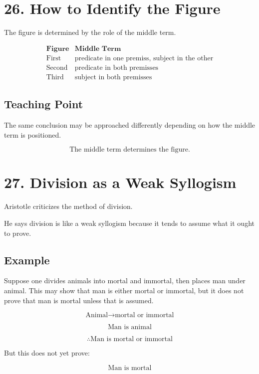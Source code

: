 \documentclass[12pt]{article}
\begin{document}
\section*{26. How to Identify the Figure}

The figure is determined by the role of the middle term.

\[
\begin{array}{c|c}
\textbf{Figure} & \textbf{Middle Term} \\
\hline
\text{First} & \text{predicate in one premiss, subject in the other} \\
\text{Second} & \text{predicate in both premisses} \\
\text{Third} & \text{subject in both premisses}
\end{array}
\]

\subsection*{Teaching Point}

The same conclusion may be approached differently depending on how the middle
term is positioned.

\[
\boxed{
\text{The middle term determines the figure.}
}
\]

\section*{27. Division as a Weak Syllogism}

Aristotle criticizes the method of division.

He says division is like a weak syllogism because it tends to assume what it
ought to prove.

\subsection*{Example}

Suppose one divides animals into mortal and immortal, then places man under
animal. This may show that man is either mortal or immortal, but it does not
prove that man is mortal unless that is assumed.

\[
\text{Animal} \rightarrow \text{mortal or immortal}
\]

\[
\text{Man is animal}
\]

\[
\therefore \text{Man is mortal or immortal}
\]

But this does not yet prove:

\[
\text{Man is mortal}
\]
\end{document}
